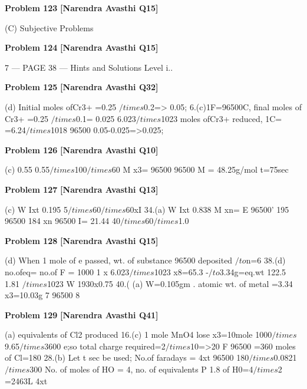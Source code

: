 \begin{problembox}
\textbf{Problem 123} \hfill \textbf{[Narendra Avasthi Q15]}
\label{q:ext-narendra_avasthi_all_questions-123}

(C)
Subjective
Problems
\end{problembox}

\begin{problembox}
\textbf{Problem 124} \hfill \textbf{[Narendra Avasthi Q15]}
\label{q:ext-narendra_avasthi_all_questions-124}

7
--- PAGE 38 ---
Hints and Solutions
Level i..
\end{problembox}

\begin{problembox}
\textbf{Problem 125} \hfill \textbf{[Narendra Avasthi Q32]}
\label{q:ext-narendra_avasthi_all_questions-125}

(d) Initial moles ofCr3+ =0.25 $/times$0.2=> 0.05;
6.(c)1F=96500C,
final moles of Cr3+ =0.25 $/times$0.1= 0.025
6.023$/times$1023
moles ofCr3+ reduced,
1C=
=6.24$/times$1018
96500
0.05-0.025=>0.025;
\end{problembox}

\begin{problembox}
\textbf{Problem 126} \hfill \textbf{[Narendra Avasthi Q10]}
\label{q:ext-narendra_avasthi_all_questions-126}

(c)
0.55
0.55$/times$100$/times$60
M
x3=
96500
96500
M = 48.25g/mol
t=75sec
\end{problembox}

\begin{problembox}
\textbf{Problem 127} \hfill \textbf{[Narendra Avasthi Q13]}
\label{q:ext-narendra_avasthi_all_questions-127}

(c)
W
Ixt
0.195
5$/times$60$/times$60xI
34.(a)
W
Ixt
0.838
M
xn=
E
96500'
195
96500
184
xn
96500
I= 21.44
40$/times$60$/times$1.0
\end{problembox}

\begin{problembox}
\textbf{Problem 128} \hfill \textbf{[Narendra Avasthi Q15]}
\label{q:ext-narendra_avasthi_all_questions-128}

(d) When 1 mole of e passed, wt. of substance
96500
deposited
$/to$n=6
38.(d) no.ofeq= no.of F =
1000
1 x 6.023$/times$1023
x8=65.3
-$/to$3.34g=eq.wt
122.5
1.81 $/times$1023
W
1930x0.75
40.(
(a)
W=0.105gm
. atomic wt. of metal =3.34 x3=10.03g
7
96500
8
\end{problembox}

\begin{problembox}
\textbf{Problem 129} \hfill \textbf{[Narendra Avasthi Q41]}
\label{q:ext-narendra_avasthi_all_questions-129}

(a) equivalents of Cl2 produced
16.(c) 1 mole MnO4 lose
x3=10mole
1000$/times$9.65$/times$3600
e;so total charge required=2$/times$10=>20 F
96500
=360
moles of Cl=180
28.(b) Let t sec be used; No.of faradays =
4xt
96500
180$/times$0.0821$/times$300
No. of moles of HO = 4, no. of equivalents
P
1.8
of H0=4$/times$2
=2463L
4xt
\end{problembox}

